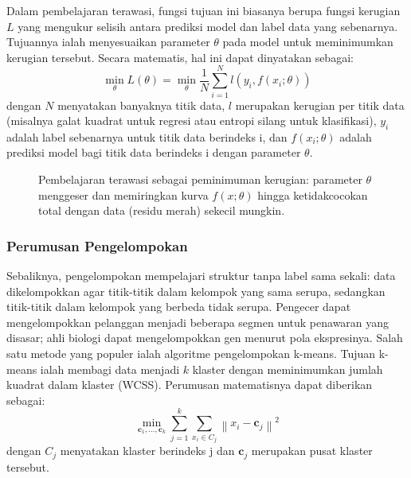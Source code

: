 Dalam pembelajaran terawasi, fungsi tujuan ini biasanya berupa fungsi kerugian \( L \) yang mengukur selisih antara prediksi model dan label data yang sebenarnya. Tujuannya ialah menyesuaikan parameter \( \theta \) pada model untuk meminimumkan kerugian tersebut. Secara matematis, hal ini dapat dinyatakan sebagai:
\begin{equation}
\min_{\theta} L(\theta) = \min_{\theta} \frac{1}{N} \sum_{i=1}^{N} l(y_i, f(x_i; \theta))
\end{equation}
dengan \( N \) menyatakan banyaknya titik data, \( l \) merupakan kerugian per titik data (misalnya galat kuadrat untuk regresi atau entropi silang untuk klasifikasi), \( y_i \) adalah label sebenarnya untuk titik data berindeks i, dan \( f(x_i; \theta) \) adalah prediksi model bagi titik data berindeks i dengan parameter \( \theta \).

\begin{figure}[h]
\centering
{}
\caption{Pembelajaran terawasi sebagai peminimuman kerugian: parameter $\theta$ menggeser dan memiringkan kurva $f(x;\theta)$ hingga ketidakcocokan total dengan data (residu merah) sekecil mungkin.}
\label{fig:ml-loss}
\end{figure}

\subsubsection*{Perumusan Pengelompokan}

Sebaliknya, pengelompokan mempelajari struktur tanpa label sama sekali: data dikelompokkan agar titik-titik dalam kelompok yang sama serupa, sedangkan titik-titik dalam kelompok yang berbeda tidak serupa. Pengecer dapat mengelompokkan pelanggan menjadi beberapa segmen untuk penawaran yang disasar; ahli biologi dapat mengelompokkan gen menurut pola ekspresinya. Salah satu metode yang populer ialah algoritme pengelompokan k-means. Tujuan k-means ialah membagi data menjadi \( k \) klaster dengan meminimumkan jumlah kuadrat dalam klaster (WCSS). Perumusan matematisnya dapat diberikan sebagai:
\begin{equation}
\min_{\mathbf{c}_1, \ldots, \mathbf{c}_k} \sum_{j=1}^{k} \sum_{x_i \in C_j} \left\| x_i - \mathbf{c}_j \right\|^2
\end{equation}
dengan \( C_j \) menyatakan klaster berindeks j dan \( \mathbf{c}_j \) merupakan pusat klaster tersebut.

